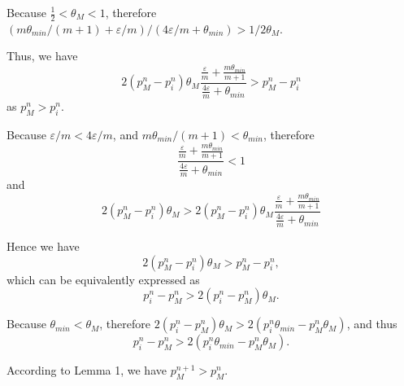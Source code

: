 \documentclass[10pt,journal,cspaper,compsoc,onecolumn]{IEEEtran}
\begin{document}
\begin{spacing}{1.2}
\begin{IEEEproof}
Because $\frac{1}{2} < \theta_M < 1$, therefore
$(m\theta_{min}/(m + 1) + \varepsilon/m)/(4\varepsilon/m + \theta_{min}) > 1/2\theta_M$.

Thus, we have
$$2(p_M^n -p_i^n)\theta_M\displaystyle\frac{\displaystyle\frac{\varepsilon}{m} +\displaystyle\frac{m\theta_{min}}{m + 1}}{\displaystyle\frac{4\varepsilon}{m} + \theta_{min}} > p_M^n -p_i^n$$
as $p_M^n > p_i^n$.

Because $\varepsilon/m < 4\varepsilon/m$, and $m\theta_{min}/(m + 1) < \theta_{min}$, therefore
$$ \displaystyle\frac{\displaystyle\frac{\varepsilon}{m} +\displaystyle\frac{m\theta_{min}}{m + 1}}{\displaystyle\frac{4\varepsilon}{m} + \theta_{min}} < 1$$
and
$$ 2(p_M^n -p_i^n)\theta_M > 2(p_M^n -p_i^n)\theta_M\displaystyle\frac{\displaystyle\frac{\varepsilon}{m} +\displaystyle\frac{m\theta_{min}}{m + 1}}{\displaystyle\frac{4\varepsilon}{m} + \theta_{min}}$$

Hence we have
$$2(p_M^n -p_i^n)\theta_M > p_M^n -p_i^n,$$
which can be equivalently expressed as
$$p_i^n -p_M^n > 2(p_i^n - p_M^n)\theta_M.$$

Because $\theta_{min} < \theta_M$, therefore
$2(p_i^n - p_M^n)\theta_M > 2(p_i^n\theta_{min} - p_M^n\theta_M)$, and thus
$$p_i^n -p_M^n > 2(p_i^n\theta_{min} - p_M^n\theta_M).$$

According to Lemma 1, we have $p_M^{n + 1} > p_M^{n}$.
\end{IEEEproof}

\end{spacing}
\end{document}
